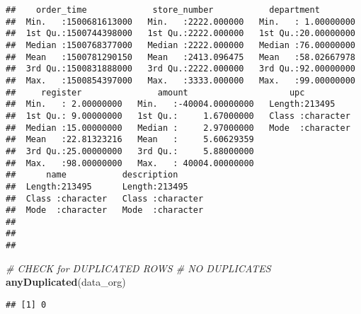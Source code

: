 \documentclass[]{article}
\newenvironment{Shaded}{\begin{snugshade}}{\end{snugshade}}
\newcommand{\KeywordTok}[1]{\textcolor[rgb]{0.13,0.29,0.53}{\textbf{#1}}}
\newcommand{\CommentTok}[1]{\textcolor[rgb]{0.56,0.35,0.01}{\textit{#1}}}
\newcommand{\NormalTok}[1]{#1}
\begin{document}
\begin{verbatim}
##    order_time             store_number           department         
##  Min.   :1500681613000   Min.   :2222.000000   Min.   : 1.00000000  
##  1st Qu.:1500744398000   1st Qu.:2222.000000   1st Qu.:20.00000000  
##  Median :1500768377000   Median :2222.000000   Median :76.00000000  
##  Mean   :1500781290150   Mean   :2413.096475   Mean   :58.02667978  
##  3rd Qu.:1500831888000   3rd Qu.:2222.000000   3rd Qu.:92.00000000  
##  Max.   :1500854397000   Max.   :3333.000000   Max.   :99.00000000  
##     register               amount                    upc           
##  Min.   : 2.00000000   Min.   :-40004.00000000   Length:213495     
##  1st Qu.: 9.00000000   1st Qu.:     1.67000000   Class :character  
##  Median :15.00000000   Median :     2.97000000   Mode  :character  
##  Mean   :22.81323216   Mean   :     5.60629359                     
##  3rd Qu.:25.00000000   3rd Qu.:     5.88000000                     
##  Max.   :98.00000000   Max.   : 40004.00000000                     
##      name           description       
##  Length:213495      Length:213495     
##  Class :character   Class :character  
##  Mode  :character   Mode  :character  
##                                       
##                                       
## 
\end{verbatim}

\begin{Shaded}
\begin{Highlighting}[]
\CommentTok{# CHECK for DUPLICATED ROWS  # NO DUPLICATES}
\KeywordTok{anyDuplicated}\NormalTok{(data_org)}
\end{Highlighting}
\end{Shaded}

\begin{verbatim}
## [1] 0
\end{verbatim}
\end{document}
